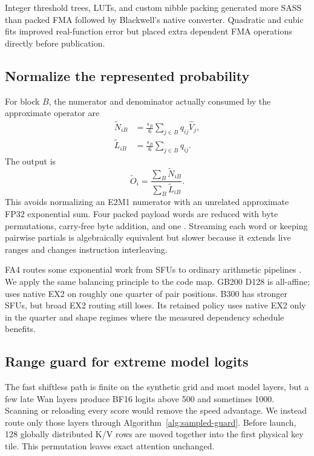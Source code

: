 Integer threshold trees, LUTs, and custom nibble packing generated more SASS
than packed FMA followed by Blackwell's native converter. Quadratic and cubic
fits improved real-function error but placed extra dependent FMA operations
directly before publication.

\subsection{Normalize the represented probability}

For block $B$, the numerator and denominator actually consumed by the
approximate operator are
\begin{align}
  \widetilde N_{iB} &= \frac{s_B}{6}
    \sum_{j\in B}q_{ij}\widehat V_j, \\
  \widetilde L_{iB} &= \frac{s_B}{6}
    \sum_{j\in B}q_{ij}.
  \label{eq:represented-contributions}
\end{align}
The output is
\begin{equation}
  \widetilde O_i=
  \frac{\sum_B\widetilde N_{iB}}{\sum_B\widetilde L_{iB}}.
  \label{eq:represented-output}
\end{equation}
This avoids normalizing an E2M1 numerator with an unrelated approximate FP32
exponential sum. Four packed payload words are reduced with byte permutations,
carry-free byte addition, and one . Streaming each word or keeping
pairwise partials is algebraically equivalent but slower because it extends
live ranges and changes instruction interleaving.

FA4 routes some exponential work from SFUs to ordinary arithmetic pipelines
\cite{zadouri2026flashattention4}. We apply the same balancing principle to
the code map. GB200 D128  is all-affine;  uses
native EX2 on roughly one quarter of pair positions. B300 has stronger SFUs,
but broad EX2 routing still loses. Its retained policy uses native EX2 only in
the quarter and shape regimes where the measured dependency schedule benefits.

\subsection{Range guard for extreme model logits}

The fast shiftless path is finite on the synthetic grid and most model
layers, but a few late Wan layers produce BF16 logits above 500 and sometimes
1000. Scanning or reloading every score would remove the speed advantage. We
instead route only those layers through Algorithm~\ref{alg:sampled-guard}.
Before launch, 128 globally distributed K/V rows are moved together into the
first physical key tile. This permutation leaves exact attention unchanged.

